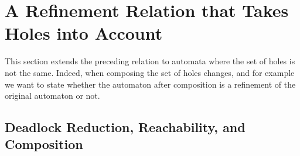 \documentclass[runningheads]{llncs}
\begin{document}
\section{A Refinement Relation that Takes Holes into Account}\label{sec:holes}

This section  extends the preceding relation to automata where the set of holes is not the same. Indeed, when composing the set of  holes changes, and for example we want to state whether the automaton after composition is a refinement of the original automaton or not.

\subsection{Deadlock Reduction, Reachability, and Composition}

\end{document}
